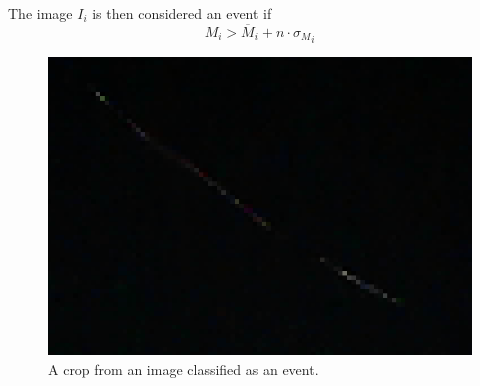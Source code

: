 \documentclass[a4paper,12pt]{article}
\begin{document}
The image $I_i$ is then considered an event if 
\begin{equation}
M_i>\overline{M}_i+n\cdot{\sigma_{M}}_{i}
\end{equation}


\begin{figure}[h!]
  \centering
  \includegraphics[scale=0.5]{bella.png}
  \caption{A crop from an image classified as an event.}
\end{figure}
\end{document}
